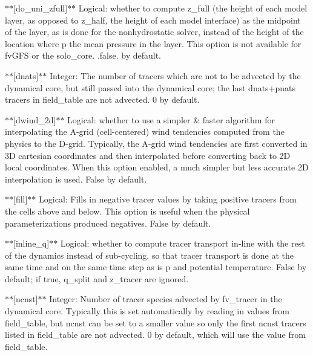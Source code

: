 $\ast$$\ast$\mbox{[}do\-\_\-uni\-\_\-zfull\mbox{]}$\ast$$\ast$ Logical\-: whether to compute z\-\_\-full (the height of each model layer, as opposed to z\-\_\-half, the height of each model interface) as the midpoint of the layer, as is done for the nonhydrostatic solver, instead of the height of the location where p the mean pressure in the layer. This option is not available for fv\-G\-F\-S or the solo\-\_\-core. .false. by default.

$\ast$$\ast$\mbox{[}dnats\mbox{]}$\ast$$\ast$ Integer\-: The number of tracers which are not to be advected by the dynamical core, but still passed into the dynamical core; the last dnats+pnats tracers in field\-\_\-table are not advected. 0 by default.

$\ast$$\ast$\mbox{[}dwind\-\_\-2d\mbox{]}$\ast$$\ast$ Logical\-: whether to use a simpler \& faster algorithm for interpolating the A-\/grid (cell-\/centered) wind tendencies computed from the physics to the D-\/grid. Typically, the A-\/grid wind tendencies are first converted in 3\-D cartesian coordinates and then interpolated before converting back to 2\-D local coordinates. When this option enabled, a much simpler but less accurate 2\-D interpolation is used. False by default.

$\ast$$\ast$\mbox{[}fill\mbox{]}$\ast$$\ast$ Logical\-: Fills in negative tracer values by taking positive tracers from the cells above and below. This option is useful when the physical parameterizations produced negatives. False by default.

$\ast$$\ast$\mbox{[}inline\-\_\-q\mbox{]}$\ast$$\ast$ Logical\-: whether to compute tracer transport in-\/line with the rest of the dynamics instead of sub-\/cycling, so that tracer transport is done at the same time and on the same time step as is {\ttfamily p} and potential temperature. False by default; if true, q\-\_\-split and z\-\_\-tracer are ignored.

$\ast$$\ast$\mbox{[}ncnst\mbox{]}$\ast$$\ast$ Integer\-: Number of tracer species advected by fv\-\_\-tracer in the dynamical core. Typically this is set automatically by reading in values from field\-\_\-table, but ncnst can be set to a smaller value so only the first ncnst tracers listed in field\-\_\-table are not advected. 0 by default, which will use the value from field\-\_\-table.

